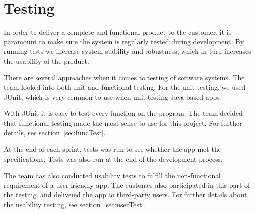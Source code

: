 \chapter{Testing}

In order to deliver a complete and functional product to the customer, it is paramount to make sure the system is regularly tested during development. 
By running tests we increase system stability and robustness, which in turn increases the usability of the product. 

There are several approaches when it comes to testing of software systems. The team looked into both \gls{unit} and functional testing. For the unit testing, we used JUnit, which is very common to use when unit testing Java based apps.

With JUnit it is easy to test every function on the program. The team decided that functional testing made the most sense to use for this project. For further details, see section~\ref{sec:funcTest}.


At the end of each sprint, tests was run to see whether the app met the specifications. Tests was also run at the end of the development process. 

The team has also conducted usability tests to fulfill the non-functional requirement of a user friendly app. The customer also participated in this part of the testing, and delivered the app to third-party users. For further details about the usability testing, see section~\ref{sec:userTest}.
\newpage


